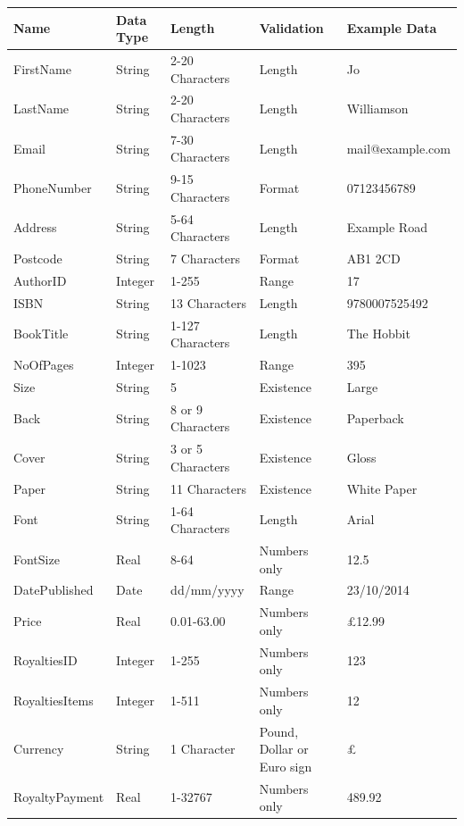 \begin{center}
\begin{tabular}{|p{2cm}|p{1cm}|p{2.5cm}|p{1.5cm}|p{3cm}|}
    \hline
    \textbf{Name} & \textbf{Data Type} & \textbf{Length} & \textbf{Validation} & \textbf{Example Data} \\ \hline
    FirstName & String & 2-20 Characters & Length & Jo  \\ \hline
    LastName & String & 2-20 Characters & Length & Williamson  \\ \hline
    Email & String & 7-30 Characters & Length & mail@example.com  \\ \hline
    PhoneNumber & String & 9-15 Characters & Format & 07123456789  \\ \hline
    Address & String & 5-64 Characters & Length & Example Road  \\ \hline
    Postcode & String & 7 Characters & Format & AB1 2CD  \\ \hline
    AuthorID & Integer & 1-255 & Range & 17  \\ \hline
    ISBN & String & 13 Characters & Length & 9780007525492 \\ \hline
    BookTitle & String & 1-127 Characters & Length & The Hobbit  \\ \hline
    NoOfPages & Integer & 1-1023 & Range & 395  \\ \hline
    Size & String & 5 & Existence & Large \\ \hline
    Back & String & 8 or 9 Characters& Existence & Paperback  \\ \hline
    Cover & String & 3 or 5 Characters & Existence & Gloss \\ \hline
    Paper & String & 11 Characters & Existence & White Paper\\ \hline
    Font & String & 1-64 Characters & Length & Arial  \\ \hline
    FontSize & Real & 8-64 & Numbers only & 12.5  \\ \hline
    DatePublished & Date & dd/mm/yyyy & Range & 23/10/2014 \\ \hline
    Price & Real & 0.01-63.00 & Numbers only & £12.99 \\ \hline
    RoyaltiesID & Integer & 1-255 & Numbers only & 123 \\ \hline
    RoyaltiesItems & Integer & 1-511 & Numbers only & 12 \\ \hline
    Currency & String & 1 Character & Pound, Dollar or Euro sign & £ \\ \hline
    RoyaltyPayment & Real & 1-32767 & Numbers only & 489.92 \\ \hline

\end{tabular}
\end{center}
